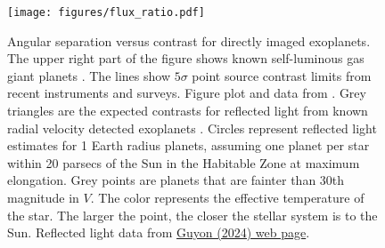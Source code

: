 \documentclass[letterpaper]{ar-1col}
\newcommand{\ld}{$\lambda/D$}
\begin{document}

\begin{figure}[ht]
  \centering
  \texttt{[image: figures/flux\_ratio.pdf]}
  \caption{Angular separation versus contrast for directly imaged exoplanets.
  The upper right part of the figure shows known self-luminous gas giant planets \citep{Lacy20}.
  The lines show  $5\sigma$ point source contrast limits from recent instruments and surveys.
  Figure plot and data from \citet{Bailey24}.%
  Grey triangles are the expected contrasts for reflected light from known radial velocity detected exoplanets \citep{Bataltha18}.
  Circles represent reflected light estimates for 1 Earth radius planets, assuming one planet per star within 20 parsecs of the Sun in the Habitable Zone at maximum elongation.
  Grey points are planets that are fainter than 30th magnitude in $V$.
  The color represents the effective temperature of the star.
  The larger the point, the closer the stellar system is to the Sun.
  Reflected light data from \href{https://subarutelescope.org/staff/guyon/04research.web/14hzplanetsELTs.web/catalog.web/content.html}{Guyon (2024) web page}.  
}
\end{figure}
\end{document}
